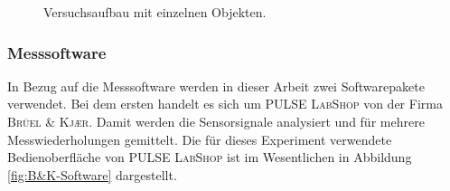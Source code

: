 	\begin{figure}[H]
		\centering
		\caption{Versuchsaufbau mit einzelnen Objekten.}
		\label{fig:Versuchsaufbau}
	\end{figure}

	
	\subsubsection{Messsoftware}\label{sec:Messsoftware}
	
	In Bezug auf die Messsoftware werden in dieser Arbeit zwei Softwarepakete verwendet. Bei dem ersten handelt es sich um \textsc{PULSE LabShop} von der Firma \textsc{Brüel \& Kj\ae{}r}. Damit werden die Sensorsignale analysiert und für mehrere Messwiederholungen gemittelt. Die für dieses Experiment verwendete Bedienoberfläche von \textsc{PULSE LabShop} ist im Wesentlichen in Abbildung \ref{fig:B&K-Software} dargestellt.
	
